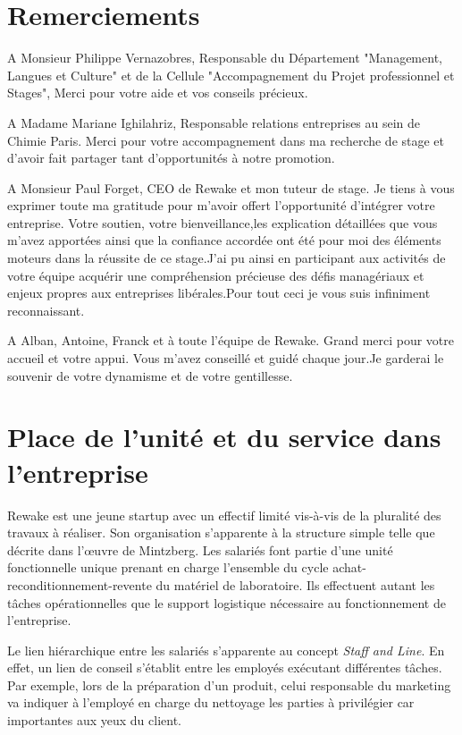 \documentclass{rapportENSCP}
\begin{document}
\section{Remerciements}
A Monsieur Philippe Vernazobres, Responsable du Département "Management, Langues et Culture" et de la Cellule "Accompagnement du Projet professionnel et Stages",
Merci pour votre aide et vos conseils précieux.

A Madame Mariane Ighilahriz, Responsable relations entreprises au sein de Chimie Paris. Merci pour votre accompagnement dans ma recherche de stage et d'avoir fait partager tant d'opportunités à notre promotion.

A Monsieur Paul Forget, CEO de Rewake et mon tuteur de stage. Je tiens à vous exprimer toute ma gratitude pour m'avoir offert l'opportunité d'intégrer votre entreprise. Votre soutien, votre bienveillance,les explication détaillées que vous m'avez apportées ainsi que la confiance accordée ont été pour moi des éléments moteurs dans la réussite de ce stage.J'ai pu ainsi en participant aux activités de votre équipe acquérir une compréhension précieuse des défis managériaux et enjeux propres aux entreprises libérales.Pour tout ceci je vous suis infiniment reconnaissant.

A Alban, Antoine, Franck et à toute l'équipe de Rewake. Grand merci pour votre accueil et votre appui. Vous m'avez conseillé et guidé chaque jour.Je garderai le souvenir de votre dynamisme et de votre gentillesse.



\section{Place de l’unité et du service dans l’entreprise}
\label{sec:section2}

Rewake est une jeune startup avec un effectif limité vis-à-vis de la pluralité des travaux à réaliser. Son organisation s’apparente à la structure simple telle que décrite dans l’œuvre de Mintzberg. Les salariés font partie d'une unité fonctionnelle unique prenant en charge l'ensemble du cycle achat-reconditionnement-revente du matériel de laboratoire. Ils effectuent autant les tâches opérationnelles que le support logistique nécessaire au fonctionnement de l'entreprise. 

Le lien hiérarchique entre les salariés s'apparente au concept \emph{Staff and Line}. En effet, un lien de conseil s'établit entre les employés exécutant différentes tâches. Par exemple, lors de la préparation d'un produit, celui responsable du marketing va indiquer à l'employé en charge du nettoyage les parties à privilégier car importantes aux yeux du client. 
\end{document}
